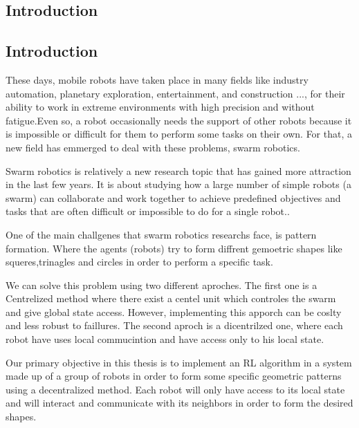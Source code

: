 \documentclass[12pt]{extarticle}
\begin{document}
\newpage
\thispagestyle{empty}
{
\hypersetup{linkcolor=false}
\tableofcontents

}
\newpage
\pagebreak
\hspace{0pt}
\vfill
\begin{center}
\section{Introduction}
\end{center}
\vfill
\hspace{0pt}
\pagebreak

\subsection{Introduction}
These days, mobile robots have taken place in many fields like industry automation, planetary exploration, entertainment, and construction ..., for their ability to work in extreme environments with high precision and without fatigue\cite{rubio2019review}.Even so, a robot occasionally needs the support of other robots because it is impossible or difficult for them to perform some tasks on their own. For that, a new field has emmerged to deal with these problems, swarm robotics.

 
Swarm robotics is relatively a new research topic that has gained more attraction in the last few years. It is about  studying how a large number of simple robots (a swarm) can collaborate and work together to achieve predefined objectives and tasks that are often difficult or impossible to do for a single robot.\cite{bayindir2016review}.

One of the main challgenes that swarm robotics researchs face, is pattern formation. Where the agents (robots) try to form diffrent gemoetric shapes like squeres,trinagles and circles in order to perform a specific task.

We can solve this problem using two different aproches. The first one is a Centrelized method where there exist a centel unit  which controles the swarm and give global state access. However,  implementing this apporch  can be coslty and less robust to faillures. The second aproch is a dicentrilzed one, where each robot have uses local commucintion and have access only to his local state.\cite{bayindir2007review}

Our primary objective in this thesis is to implement an RL algorithm in a system made up of a group of robots in order to form some specific geometric patterns using a decentralized  method. Each robot will only have access to its local state and will interact and communicate with its neighbors in order to form the desired shapes.
 
\end{document}
